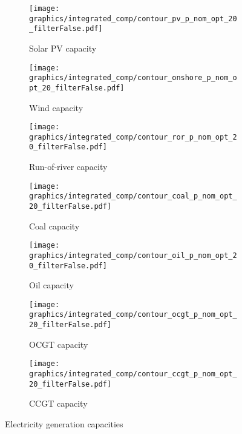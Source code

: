 \begin{figure*}[h] %
    \centering
    \begin{subfigure}[b]{0.45\linewidth}
        \centering
        \texttt{[image: graphics/integrated\_comp/contour\_pv\_p\_nom\_opt\_20\_filterFalse.pdf]}
        \caption{Solar PV capacity}
    \end{subfigure}
    \hfill
    \begin{subfigure}[b]{0.45\linewidth}
        \centering
        \texttt{[image: graphics/integrated\_comp/contour\_onshore\_p\_nom\_opt\_20\_filterFalse.pdf]}
        \caption{Wind capacity}
    \end{subfigure}
    \hfill
    \begin{subfigure}[b]{0.45\linewidth}
        \centering
        \texttt{[image: graphics/integrated\_comp/contour\_ror\_p\_nom\_opt\_20\_filterFalse.pdf]}
        \caption{Run-of-river capacity}
    \end{subfigure}
    \hfill
    \begin{subfigure}[b]{0.45\linewidth}
        \centering
        \texttt{[image: graphics/integrated\_comp/contour\_coal\_p\_nom\_opt\_20\_filterFalse.pdf]}
        \caption{Coal capacity}
    \end{subfigure}
    \hfill
    \begin{subfigure}[b]{0.45\linewidth}
        \centering
        \texttt{[image: graphics/integrated\_comp/contour\_oil\_p\_nom\_opt\_20\_filterFalse.pdf]}
        \caption{Oil capacity}
    \end{subfigure}
    \hfill
    \begin{subfigure}[b]{0.45\linewidth}
        \centering
        \texttt{[image: graphics/integrated\_comp/contour\_ocgt\_p\_nom\_opt\_20\_filterFalse.pdf]}
        \caption{OCGT capacity}
    \end{subfigure}
    \hfill
    \begin{subfigure}[b]{0.45\linewidth}
        \centering
        \texttt{[image: graphics/integrated\_comp/contour\_ccgt\_p\_nom\_opt\_20\_filterFalse.pdf]}
        \caption{CCGT capacity}
    \end{subfigure}
    \hfill

    \caption{Electricity generation capacities}
    \label{fig:capacities}
\end{figure*}




